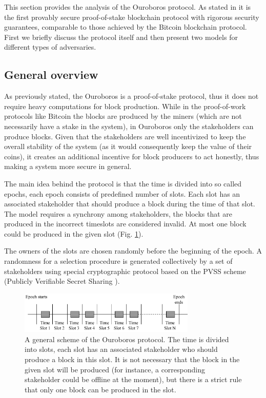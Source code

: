 \documentclass[10pt,a4paper]{article}
\numberwithin{equation}{section} %
\theoremstyle{plain}
\theoremstyle{definition}
\theoremstyle{remark}
\begin{document}
	This section provides the analysis of the Ouroboros protocol. As stated in \cite{KRDO16} it is the first provably secure proof-of-stake blockchain protocol with rigorous security guarantees, comparable to those achieved by the Bitcoin blockchain protocol.
	First we briefly discuss the protocol itself and then present two models for different types of adversaries.
	
	\subsection{General overview}
	
	As previously stated, the Ouroboros is a proof-of-stake protocol, thus it does not require heavy computations for block production. While in the proof-of-work protocols like Bitcoin the blocks are produced by the miners (which are not necessarily have a stake in the system), in Ouroboros only the stakeholders can produce blocks. Given that the stakeholders are well incentivized to keep the overall stability of the system (as it would consequently keep the value of their coins), it creates an additional incentive for block producers to act honestly, thus making a system more secure in general. 
	
	The main idea behind the protocol is that the time is divided into so called epochs, each epoch consists of predefined number of slots. Each slot has an associated stakeholder that should produce a block during the time of that slot. The model requires a synchrony among stakeholders, the blocks that are produced in the incorrect timeslots are considered invalid. At most one block could be produced in the given slot (Fig. \ref{fig:ouroboros_general}).
	
	The owners of the slots are chosen randomly before the beginning of the epoch. A randomness for a selection procedure is generated collectively by a set of stakeholders using special cryptographic protocol based on the PVSS scheme (Publicly Verifiable Secret Sharing \cite{S99}).
	
	\begin{figure}[h] 
        \centering
        \includegraphics[width=0.75\textwidth]{Ouroboros_general}
        \caption{A general scheme of the Ouroboros protocol. The time is divided into slots, each slot has an associated stakeholder who should produce a block in this slot. It is not necessary that the block in the given slot will be produced (for instance, a corresponding stakeholder could be offline at the moment), but there is a strict rule that only one block can be produced in the slot.}
        \label{fig:ouroboros_general}
    \end{figure}
    
\end{document}
